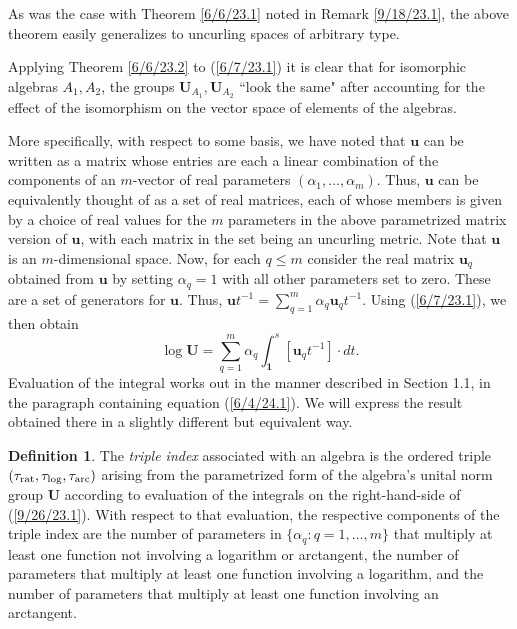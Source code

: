 \documentclass{amsart}
\numberwithin{equation}{section}
\theoremstyle{definition}
\newtheorem{definition}[theorem]{Definition}
\numberwithin{theorem}{section}
\begin{document}
As was the case with Theorem \ref{6/6/23.1} noted in Remark \ref{9/18/23.1}, the above theorem easily generalizes to uncurling spaces of arbitrary type.

Applying Theorem \ref{6/6/23.2} to (\ref{6/7/23.1}) it is clear that for isomorphic algebras $A_1,A_2$, the groups $\mathbf{U}_{A_1},  \mathbf{U}_{A_2}$ ``look the same" after accounting for the effect of the isomorphism on the vector space of elements of the algebras.

More specifically, with respect to some basis, we have noted that $\mathbf{u}$ can be written as a matrix whose entries are each a linear combination of the components of an $m$-vector of real parameters $(\alpha_1, \dots, \alpha_m)$.   Thus, $\mathbf{u}$ can be equivalently thought of as a set of real matrices, each of whose members is given by a choice of real values for the $m$ parameters in the above parametrized matrix version of $\mathbf{u}$, with each matrix in the set being an uncurling metric.   Note that $\mathbf{u}$ is an $m$-dimensional space.    Now, for each $q\le m$ consider the real matrix  $\mathbf{u}_q$ obtained from $\mathbf{u}$ by setting $\alpha_q =1$ with all other parameters set to zero.  These are a set of generators for $\mathbf{u}$. Thus, $\mathbf{u}t^{-1} = \sum_{q=1}^m \alpha_q \mathbf{u}_q t^{-1}$.   Using (\ref{6/7/23.1}), we then obtain \begin{equation}\label{9/26/23.1} \log  \mathbf{U} =\sum_{q=1}^m \alpha_q \int_{\mathbf{1}}^s [\mathbf{u}_q t^{-1}]\cdot dt.\end{equation}  
Evaluation of the integral works out in the manner described in Section 1.1, in the paragraph containing equation (\ref{6/4/24.1}).  We will express the result obtained there in a slightly different but equivalent way.

\begin{definition}\label{5/22/24.1} The {\it triple index} associated with an algebra is the ordered triple $(\tau_{\rm rat},\tau_{\rm log},\tau_{\rm arc})$ arising from the parametrized form of the algebra's unital norm group $\mathbf{U}$ according to evaluation of the integrals on the right-hand-side of (\ref{9/26/23.1}).   With respect to that evaluation, the respective components of the triple index are the number of parameters in $\{\alpha_q:q=1,\dots,m\}$ that multiply at least one function not involving a logarithm or arctangent, the number of parameters that multiply at least one function involving a logarithm, and the number of parameters that multiply at least one function involving an arctangent.
\end{definition}
\end{document}
